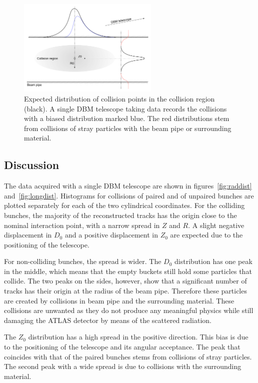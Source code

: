 \begin{figure}[!t]
\centering
\includegraphics[width=0.6\textwidth]{04_charge_monitoring/pics/positioningdata}
\caption{Expected distribution of collision points in the collision region (black). A single DBM telescope taking data records the collisions with a biased distribution marked blue. The red distributions stem from collisions of stray particles with the beam pipe or surrounding material.}
\label{fig:positioningdata}
\end{figure}

\subsection{Discussion}
The data acquired with a single DBM telescope are shown in figures~\ref{fig:raddist} and~\ref{fig:longdist}. Histograms for collisions of paired and of unpaired bunches are plotted separately for each of the two cylindrical coordinates. For the colliding bunches, the majority of the reconstructed tracks has the origin close to the nominal interaction point, with a narrow spread in $Z$ and $R$. A slight negative displacement in $D_\mathrm{0}$ and a positive displacement in $Z_\mathrm{0}$ are expected due to the positioning of the telescope.

For non-colliding bunches, the spread is wider. The $D_\mathrm{0}$ distribution has one peak in the middle, which means that the empty buckets still hold some particles that collide. The two peaks on the sides, however, show that a significant number of tracks has their origin at the radius of the beam pipe. Therefore these particles are created by collisions in beam pipe and the surrounding material. These collisions are unwanted as they do not produce any meaningful physics while still damaging the ATLAS detector by means of the scattered radiation. 

The $Z_\mathrm{0}$ distribution has a high spread in the positive direction. This bias is due to the positioning of the telescope and its angular acceptance. The peak that coincides with that of the paired bunches stems from collisions of stray particles. The second peak with a wide spread is due to collisions with the surrounding material.

